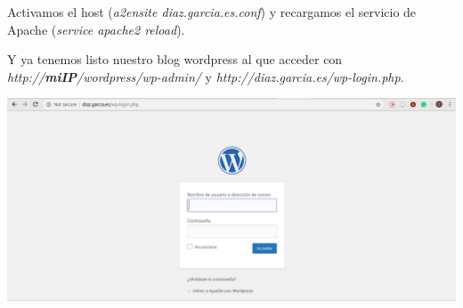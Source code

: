 \documentclass{article}
\begin{document}
Activamos el host (\textit{a2ensite diaz.garcia.es.conf}) y recargamos el servicio de Apache (\textit{service apache2 reload}).

Y ya tenemos listo nuestro blog wordpress al que acceder con \textit{http://\textbf{miIP}/wordpress/wp-admin/} y \textit{http://diaz.garcia.es/wp-login.php}.

\begin{flushleft}
\includegraphics[scale=0.27]{wordp.png}
\end{flushleft}
\end{document}
